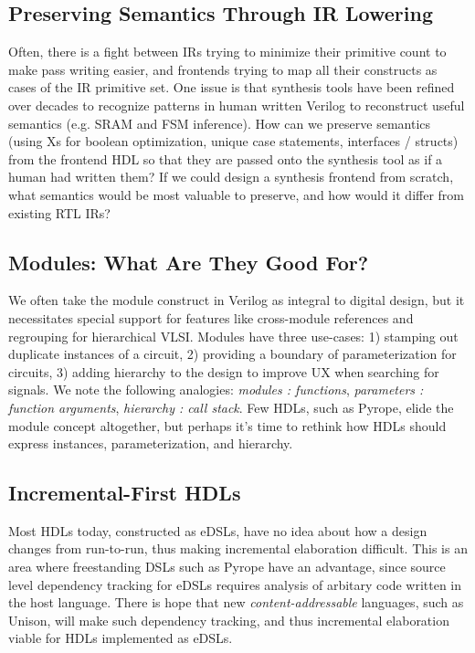 \documentclass[sigplan,review,nonacm]{acmart}
\begin{document}
\subsection{Preserving Semantics Through IR Lowering}


Often, there is a fight between IRs trying to minimize their primitive count to make pass writing easier, and frontends trying to map all their constructs as cases of the IR primitive set.
One issue is that synthesis tools have been refined over decades to recognize patterns in human written Verilog to reconstruct useful semantics (e.g. SRAM and FSM inference).
How can we preserve semantics (using Xs for boolean optimization, unique case statements, interfaces / structs) from the frontend HDL so that they are passed onto the synthesis tool as if a human had written them?
If we could design a synthesis frontend from scratch, what semantics would be most valuable to preserve, and how would it differ from existing RTL IRs?

\subsection{Modules: What Are They Good For?}

We often take the module construct in Verilog as integral to digital design, but it necessitates special support for features like cross-module references and regrouping for hierarchical VLSI.
Modules have three use-cases: 1) stamping out duplicate instances of a circuit, 2) providing a boundary of parameterization for circuits, 3) adding hierarchy to the design to improve UX when searching for signals.
We note the following analogies: \textit{modules : functions}, \textit{parameters : function arguments}, \textit{hierarchy : call stack}.
Few HDLs, such as Pyrope\cite{pyrope}, elide the module concept altogether, but perhaps it's time to rethink how HDLs should express instances, parameterization, and hierarchy.

\subsection{Incremental-First HDLs}

Most HDLs today, constructed as eDSLs, have no idea about how a design changes from run-to-run, thus making incremental elaboration difficult.
This is an area where freestanding DSLs such as Pyrope have an advantage, since source level dependency tracking for eDSLs requires analysis of arbitary code written in the host language.
There is hope that new \textit{content-addressable} languages, such as Unison\cite{unison}, will make such dependency tracking, and thus incremental elaboration viable for HDLs implemented as eDSLs.
\end{document}
